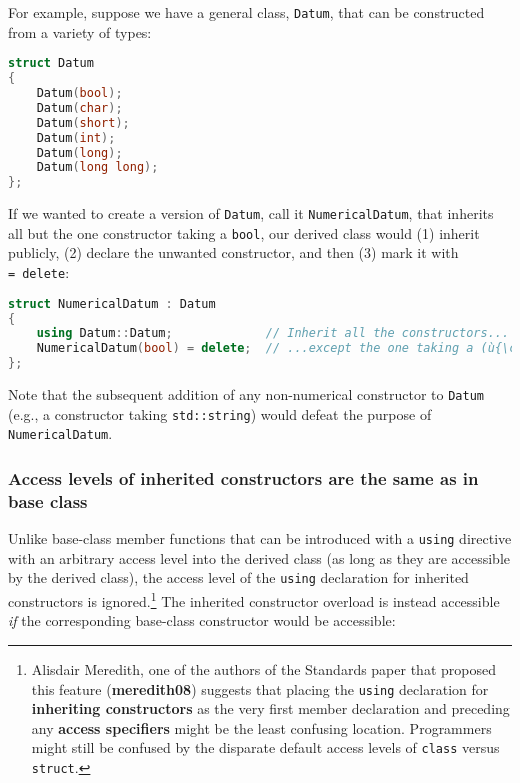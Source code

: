 For example, suppose we have a general class, \texttt{Datum}, that can
be constructed from a variety of types:

\begin{lstlisting}[language=C++]
struct Datum
{
    Datum(bool);
    Datum(char);
    Datum(short);
    Datum(int);
    Datum(long);
    Datum(long long);
};
\end{lstlisting}
    
\noindent If we wanted to create a version of \texttt{Datum}, call it
\texttt{NumericalDatum}, that inherits all but the one constructor
taking a \texttt{bool}, our derived class would (1) inherit publicly, 
(2) declare the unwanted constructor, and then (3) mark it with
\texttt{=}~\texttt{delete}:

\begin{lstlisting}[language=C++]
struct NumericalDatum : Datum
{
    using Datum::Datum;             // Inherit all the constructors...
    NumericalDatum(bool) = delete;  // ...except the one taking a (ù{\codeincomments{bool}}ù).
};
\end{lstlisting}
    
\noindent Note that the subsequent addition of any non-numerical constructor to
\texttt{Datum} (e.g., a constructor taking \texttt{std::string}) would
defeat the purpose of \texttt{NumericalDatum}.

\subsubsection[Access levels of inherited constructors are the same as in base class]{Access levels of inherited constructors are the same as in base class}\label{access-levels-of-inherited-constructors-are-same-as-in-base-class}

Unlike base-class member functions that can be introduced with a
\texttt{using} directive with an arbitrary access level into the derived
class (as long as they are accessible by the derived class), the access
level of the \texttt{using} declaration for inherited constructors is
ignored.{\cprotect\footnote{Alisdair Meredith, one of the authors of the
Standards paper that proposed this feature (\textbf{meredith08}) suggests that
placing the \texttt{using} declaration for \textbf{inheriting
constructors} as the very first member declaration and preceding any
\textbf{access specifiers} might be the least confusing location. Programmers might still be confused by
the disparate default access levels of \texttt{class} versus
  \texttt{struct}.}} The inherited constructor overload is instead
accessible \emph{if} the corresponding base-class constructor would be
accessible:

